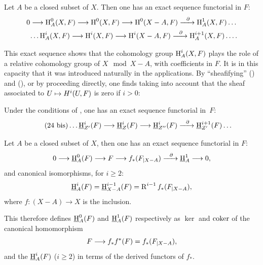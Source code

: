 \begin{corollary} \label{I.2.9}
Let $A$ be a closed subset of $X$. Then one has an exact sequence functorial in $F$:
\begin{equation} \label{eq:I.27}
\begin{gathered}
0 \to \H^0_A(X, F) \to \H^0(X, F) \to \H^0(X-A, F) \lto{\partial} \H^1_A(X, F) \dots\\
\phantom{0}\dots \H^i_A(X, F) \to \H^i(X, F) \to \H^i(X-A, F) \lto{\partial} \H^{i+1}_A(X, F)\dots.
\end{gathered}
\end{equation}
\end{corollary}

This exact sequence shows that the cohomology group $\operatorname{H}^i_A(X,
F)$ plays the role of a relative cohomology group of $X\mod
X-A$, with coefficients in $F$. It is in this capacity that it
was introduced naturally in the applications. By
``sheafifying'' () and (), or by
proceeding directly, one finds taking into account that
the sheaf associated to $U\mto H^i(U, F)$ is zero if $i>0$:

\begin{corollary} \label{I.2.10}
Under the conditions of , one has an exact sequence functorial in~$F$:
\begin{equation*} \label{eq:I.24bis} \tag{24 bis}
\dots \SheafH^i_{Z'}(F) \to \SheafH^i_{Z}(F) \to \SheafH_{Z''}^i(F) \lto{\partial} \SheafH_{Z'}^{i+1}(F) \dots
\end{equation*}
\end{corollary}

\begin{corollary} \label{I.2.11}
Let $A$ be a closed subset of $X$, then one has an exact sequence functorial in $F$:
\begin{equation} \label{eq:I.28}
0 \to \SheafH_A^0(F) \to F \to f_*(F\rest{X-A}) \lto{\partial} \SheafH_A^1 \to 0,
\end{equation}
and canonical isomorphisms, for $i\geq 2$:
\begin{equation} \label{eq:I.29}
\operatorname{\underline{H}}_A^i(F)= \operatorname{\underline{H}}_{X-A}^{i-1}(F)=\operatorname{R}^{i-1}f_*(F_{|X-A}),
\end{equation}
where $f: (X-A) \to X$ is the inclusion.
\end{corollary}

This therefore defines $\operatorname{\underline{H}}^0_A(F)$ and $\operatorname{\underline{H}}_A^1(F)$ respectively as $\ker$ and $\operatorname{coker}$ of the canonical homomorphism
$$F \to f_*f^*(F)= f_*(F\rest{X-A}),
$$
and the $\operatorname{\underline{H}}_A^i(F)$ ($i\geq 2$) in terms of the derived functors of $f_*$.

